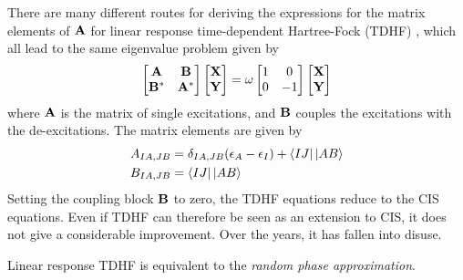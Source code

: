 There are many different routes for deriving the expressions for the matrix elements of $\mathbf{A}$ for linear response time-dependent Hartree-Fock (TDHF) \cite{Dre2005}, which all lead to the same eigenvalue problem given by 
\begin{equation}
\begin{bmatrix}
\mathbf{A} & \mathbf{B} \\
\mathbf{B}^* & \mathbf{A}^* 
\end{bmatrix} 
\begin{bmatrix}
\mathbf{X} \\
\mathbf{Y} 
\end{bmatrix}
= 
\omega 
\begin{bmatrix}
1 & 0 \\
0 & -1
\end{bmatrix}
\begin{bmatrix}
\mathbf{X} \\
\mathbf{Y} 
\end{bmatrix}
\label{eq:TDSCF}
\end{equation}
\noindent where $\mathbf{A}$ is the matrix of single excitations, and $\mathbf{B}$ couples the excitations with the de-excitations. The matrix elements are given by
\begin{align}
A_{IA,JB} &= \delta_{IA,JB} (\eps_A - \eps_I) + \sbra{IJ}\sket{AB} \\
B_{IA,JB} &= \sbra{IJ}\sket{AB}
\end{align}
\noindent Setting the coupling block $\mathbf{B}$ to zero, the TDHF equations reduce to the CIS equations. Even if TDHF can therefore be seen as an extension to CIS, it does not give a considerable improvement. Over the years, it has fallen into disuse.

Linear response TDHF is equivalent to the \emph{random phase approximation}. 


